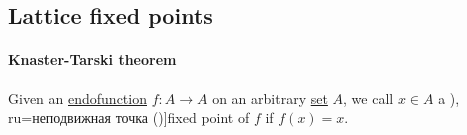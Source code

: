 \subsection{Lattice fixed points}\label{subsec:lattice_fixed_points}

\paragraph{Knaster-Tarski theorem}

\begin{definition}\label{def:fixed_point}
  Given an \hyperref[def:function/endofunction]{endofunction} \( f: A \to A \) on an arbitrary \hyperref[def:set]{set} \( A \), we call \( x \in A \) a \term[bg=неподвижна точка (\cite[138]{Боянов2008}), ru=неподвижная точка (\cite[\S 1.8.6]{Новиков2013})]{fixed point} of \( f \) if \( f(x) = x \).
\end{definition}

